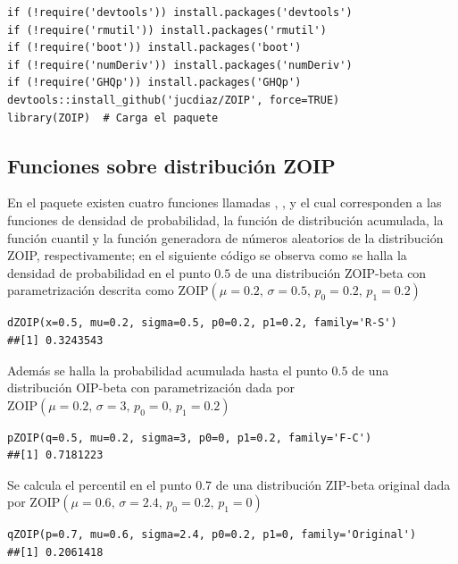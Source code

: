 \begin{verbatim}
if (!require('devtools')) install.packages('devtools')
if (!require('rmutil')) install.packages('rmutil')
if (!require('boot')) install.packages('boot')
if (!require('numDeriv')) install.packages('numDeriv')
if (!require('GHQp')) install.packages('GHQp')
devtools::install_github('jucdiaz/ZOIP', force=TRUE)
library(ZOIP)  # Carga el paquete
\end{verbatim}

\subsection{Funciones sobre distribuci\'{o}n ZOIP}

En el paquete  existen cuatro funciones llamadas , ,  y  el cual corresponden a las funciones de densidad de probabilidad, la funci\'{o}n de distribuci\'{o}n acumulada, la funci\'{o}n cuantil y la funci\'{o}n generadora de n\'{u}meros aleatorios de la distribuci\'{o}n ZOIP, respectivamente; en el siguiente c\'{o}digo se observa como se halla la densidad de probabilidad en el punto $0.5$ de una distribuci\'{o}n ZOIP-beta con parametrizaci\'{o}n \cite{Stasinopoulos2} descrita como $\text{ZOIP}(\mu=0.2, \, \sigma=0.5, \, p_0=0.2, \, p_1=0.2)$\\

\begin{verbatim}
dZOIP(x=0.5, mu=0.2, sigma=0.5, p0=0.2, p1=0.2, family='R-S')
##[1] 0.3243543
\end{verbatim}

Adem\'{a}s se halla la probabilidad acumulada hasta el punto $0.5$ de una distribuci\'{o}n OIP-beta con parametrizaci\'{o}n \cite{Ferrari2} dada por $\text{ZOIP}(\mu=0.2, \, \sigma=3, \, p_0=0, \, p_1=0.2)$\\

\begin{verbatim}
pZOIP(q=0.5, mu=0.2, sigma=3, p0=0, p1=0.2, family='F-C')
##[1] 0.7181223
\end{verbatim}

Se calcula el percentil en el punto $0.7$ de una distribuci\'{o}n ZIP-beta original dada por $\text{ZOIP}(\mu=0.6, \, \sigma=2.4, \, p_0=0.2, \, p_1=0)$\\

\begin{verbatim}
qZOIP(p=0.7, mu=0.6, sigma=2.4, p0=0.2, p1=0, family='Original')
##[1] 0.2061418
\end{verbatim}


